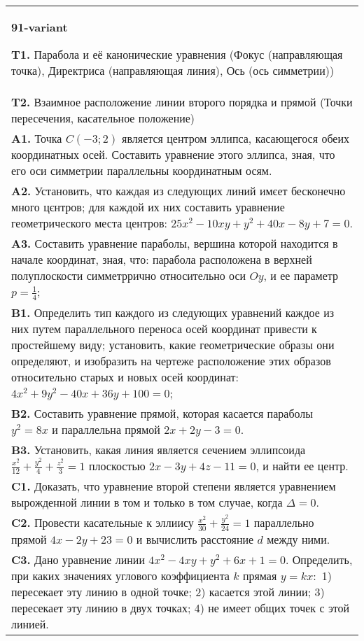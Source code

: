\documentclass{article}
\begin{document}
\begin{tabular}{m{17cm}}
\textbf{91-variant}
\newline

\textbf{T1.} Парабола и её канонические уравнения (Фокус (направляющая точка), Директриса (направляющая линия), Ось (ось симметрии)) \\
\textbf{T2.} Взаимное расположение линии второго порядка и прямой (Точки пересечения, касательное положение) \\
\textbf{A1.} Точка $C(-3 ; 2)$ является центром эллипса, касающегося обеих координатных осей. Составить уравнение этого эллипса, зная, что его оси симметрии параллельны координатным осям. \\
\textbf{A2.} Установить, что каждая из следующих линий имєет бесконечно много цєнтров; для каждой их них составить уравнение геометрического места центров: $25 x^2-10 x y+y^2+40 x-8 y+7=0$. \\
\textbf{A3.} Составить уравнение параболы, вершина которой находится в начале координат, зная, что: парабола расположена в верхней полуплоскости симметррично относительно оси $O y$, и ее параметр $p=\frac{1}{4}$; \\
\textbf{B1.} Определить тип каждого из следующих уравнений каждое из них путем параллельного переноса осей координат привести к простейшему виду; установить, какие геометрические образы они определяют, и изобразить на чертеже расположение этих образов относительно старых и новых осей координат: $4 x^2+9 y^2-40 x+36 y+100=0$; \\
\textbf{B2.} Составить уравнение прямой, которая касается параболы $y^2=8 x$ и параллельна прямой $2 x+2 y-3=0$. \\
\textbf{B3.} Установить, какая линия является сечением эллипсоида $\frac{x^2}{12}+\frac{y^2}{4}+\frac{z^2}{3}=1$ плоскостью $2 x-3 y+4 z-11=0$, и найти ее центр. \\
\textbf{C1.} Доказать, что уравнение второй степени является уравнением вырожденной линии в том и только в том случае, когда $\Delta=0$. \\
\textbf{C2.} Провести касательные к эллиису $\frac{x^2}{30}+\frac{y^2}{24}=1$ параллельно прямой $4 x-2 y+23=0$ и вычислить расстояние $d$ между ними. \\
\textbf{C3.} Дано уравнение линии $4 x^2-4 x y+y^2+6 x+1=0$. Определить, при каких значениях углового коэффициента $k$ прямая $y=k x:$ 1) пересекает эту линию в одной точке; 2) касается этой линии; 3) пересекает эту линию в двух точках; 4) не имеет общих точек с этой линией. \\

\end{tabular}
\vspace{1cm}
\end{document}
